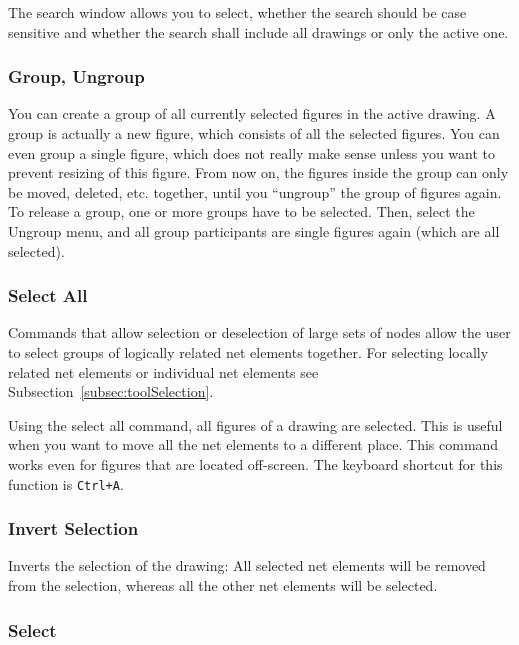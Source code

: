 
The search window allows you to select, whether the search should
be case sensitive and whether the search shall include all drawings or only
the active one.


\subsubsection{Group, Ungroup}

You can create a group of all currently selected figures in the active
drawing. A group is actually a new figure, which consists of all the
selected figures. You can even group a single figure, which does not
really make sense unless you want to prevent resizing of this figure.
From now on, the figures inside the group can only be moved, deleted,
etc. together, until you ``ungroup'' the group of figures again.
To release a group, one or more groups have to be selected.
Then, select the Ungroup menu, and all group participants are single
figures again (which are all selected).

\subsubsection{Select All}

Commands that allow selection or deselection
of large sets of nodes allow the user
to select groups of logically related net elements together.
For selecting locally related net elements or individual net
elements see Subsection~\ref{subsec:toolSelection}.

Using the select all command, all figures of a drawing are selected.
This is useful when you want to move all the net elements
to a different place. This command works even for figures that are located
off-screen.
The keyboard shortcut for this function is \texttt{Ctrl+A}.

\subsubsection{Invert Selection}

Inverts the selection of the drawing: All selected net elements will be
removed from the selection, whereas all the other net elements will be
selected.

\subsubsection{Select}


